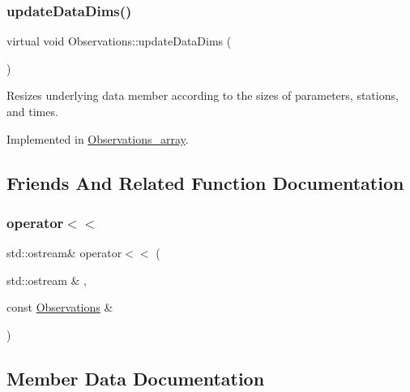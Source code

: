 \mbox{\label{class_observations_aab0540879c2d3fdf5f91d30ea2f902fd}} 
\subsubsection{\texorpdfstring{update\+Data\+Dims()}{updateDataDims()}}
{\footnotesize\ttfamily virtual void Observations\+::update\+Data\+Dims (\begin{DoxyParamCaption}{ }\end{DoxyParamCaption})\hspace{0.3cm}{\ttfamily [pure virtual]}}

Resizes underlying data member according to the sizes of parameters, stations, and times. 

Implemented in \mbox{\hyperlink{class_observations__array_aa9364c4356d1f8a2b430c93a1fcd021f}{Observations\+\_\+array}}.



\subsection{Friends And Related Function Documentation}
\mbox{\label{class_observations_ad93ae2b52ac4bae27e3419d1545ee68f}} 
\subsubsection{\texorpdfstring{operator$<$$<$}{operator<<}}
{\footnotesize\ttfamily std\+::ostream\& operator$<$$<$ (\begin{DoxyParamCaption}\item[{std\+::ostream \&}]{,  }\item[{const \mbox{\hyperlink{class_observations}{Observations}} \&}]{ }\end{DoxyParamCaption})\hspace{0.3cm}{\ttfamily [friend]}}



\subsection{Member Data Documentation}
\mbox{\label{class_observations_a9e80eaaa9c096dda1dbbe8fcf631c087}} 
